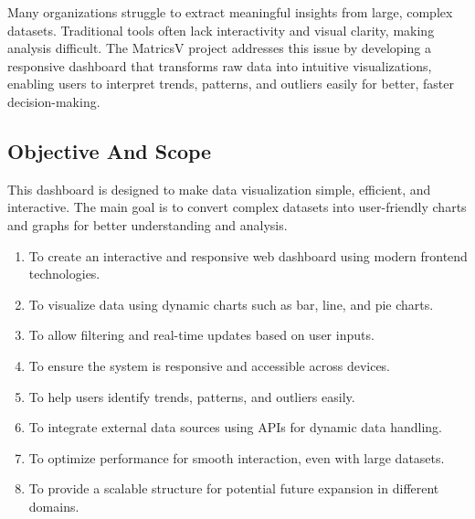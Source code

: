 Many organizations struggle to extract meaningful insights from large, complex datasets. Traditional tools often lack interactivity and visual clarity, making analysis difficult. The MatricsV project addresses this issue by developing a responsive dashboard that transforms raw data into intuitive visualizations, enabling users to interpret trends, patterns, and outliers easily for better, faster decision-making.




\subsection{Objective And Scope}



This dashboard is designed to make data visualization simple, efficient, and interactive. The main goal is to convert complex datasets into user-friendly charts and graphs for better understanding and analysis.
\begin{enumerate}

	 \item {To create an interactive and responsive web dashboard using modern frontend technologies.}
	 \item {To visualize data using dynamic charts such as bar, line, and pie charts.}
	 \item {To allow filtering and real-time updates based on user inputs.}
	 \item {To ensure the system is responsive and accessible across devices.}
	 \item {To help users identify trends, patterns, and outliers easily.}
	 \item {To integrate external data sources using APIs for dynamic data handling.}
	 \item {To optimize performance for smooth interaction, even with large datasets.}
	 \item {To provide a scalable structure for potential future expansion in different domains.}
	 
 \end{enumerate}
 



